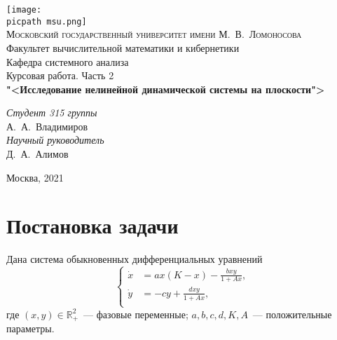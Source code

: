 \documentclass[oneside,final,12pt]{article}
\newcommand*\Rn  [1]{\mathbb{R}^{#1}}
\newcommand*\picpath{pictures/}
\theoremstyle{plain}
\theoremstyle{remark}
\theoremstyle{definition}
\theoremstyle{plain}
\begin{document}
	\begin{titlepage}
		\begin{centering}
			\texttt{[image: \\picpath msu.png]}\\
			{\scshape Московский государственный университет имени М.~В.~Ломоносова}\\
			Факультет вычислительной математики и кибернетики\\
			Кафедра системного анализа\\
			\vfill
			{\LARGE Курсовая работа. Часть 2}\\
			\vspace{1cm}
			{\Huge\bfseries "<Исследование нелинейной динамической системы на плоскости">\\}
		\end{centering}
		\vspace{1cm}
		\begin{flushright}
			\begin{large}
				{\itshape Студент 315 группы\\}
				А.~А.~Владимиров\\
				\vspace{5mm}
				{\itshape Научный руководитель\\}
				Д.~А.~Алимов\\
			\end{large}
		\end{flushright}
		\vfill
		\begin{centering}
			Москва, 2021\\ 
		\end{centering}
	\newpage
	\end{titlepage}
	\setcounter{page}{2}
	
	\tableofcontents

	\section{Постановка задачи}
		Дана система обыкновенных дифференциальных уравнений
		\begin{equation}\label{odu} \left\{ \begin{aligned}
			\dot x & = ax(K-x) - \frac{bxy}{1+Ax},\\
			\dot y & = -cy + \frac{dxy}{1+Ax},	\\
		\end{aligned}\right. \end{equation}
где \((x,y) \in \Rn{2}_+\)~--- фазовые переменные; \(a, b, c, d, K, A\)~--- положительные параметры.
		
\end{document}
